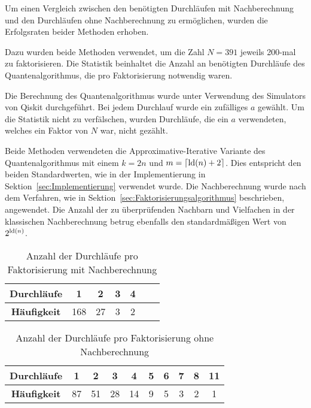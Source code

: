 Um einen Vergleich zwischen den benötigten Durchläufen mit Nachberechnung und den Durchläufen ohne Nachberechnung zu ermöglichen, 
wurden die Erfolgsraten beider Methoden erhoben.

Dazu wurden beide Methoden verwendet, um die Zahl \(N=391\) jeweils 200-mal zu faktorisieren.
Die Statistik beinhaltet die Anzahl an benötigten Durchläufe des Quantenalgorithmus, die pro Faktorisierung notwendig waren.

Die Berechnung des Quantenalgorithmus wurde unter Verwendung des Simulators von Qiskit durchgeführt. 
Bei jedem Durchlauf wurde ein zufälliges \(a\) gewählt.
Um die Statistik nicht zu verfälschen, wurden Durchläufe, die ein \(a\) verwendeten, 
welches ein Faktor von \(N\) war, nicht gezählt.

Beide Methoden verwendeten die Approximative-Iterative Variante des Quantenalgorithmus mit einem \(k=2n\) und \(m=\lceil\operatorname{ld}(n)+2\rceil\).
Dies entspricht den beiden Standardwerten, 
wie in der Implementierung in Sektion~\ref{sec:Implementierung} verwendet wurde. 
Die Nachberechnung wurde nach dem Verfahren, wie in Sektion~\ref{sec:Faktorisierungsalgorithmus} beschrieben, angewendet. 
Die Anzahl der zu überprüfenden Nachbarn und Vielfachen in der klassischen Nachberechnung betrug ebenfalls den standardmäßigen Wert von \(2^{\operatorname{ld}(n)}\).

\begin{table}[h]
    \centering
    \begin{tabular}{|c|c|c|c|c|c|c|} 
        \hline
        \textbf{Durchläufe} & 1 & 2 & 3 & 4\\
        \hline
        \textbf{Häufigkeit} & 168 & 27 & 3 & 2 \\
        \hline
    \end{tabular}
    \caption{Anzahl der Durchläufe pro Faktorisierung mit Nachberechnung}
    \label{Nachberechnung}
\end{table}

\begin{table}[h]
    \centering
    \begin{tabular}{|c|c|c|c|c|c|c|c|c|c|} 
        \hline
        \textbf{Durchläufe} & 1 & 2 & 3 & 4 & 5 & 6 & 7 & 8 & 11 \\
        \hline
        \textbf{Häufigkeit} & 87 & 51 & 28 & 14 & 9 & 5 & 3 & 2 & 1 \\
        \hline
    \end{tabular}
    \caption{Anzahl der Durchläufe pro Faktorisierung ohne Nachberechnung}
    \label{ohneNachberechnung}
\end{table}

